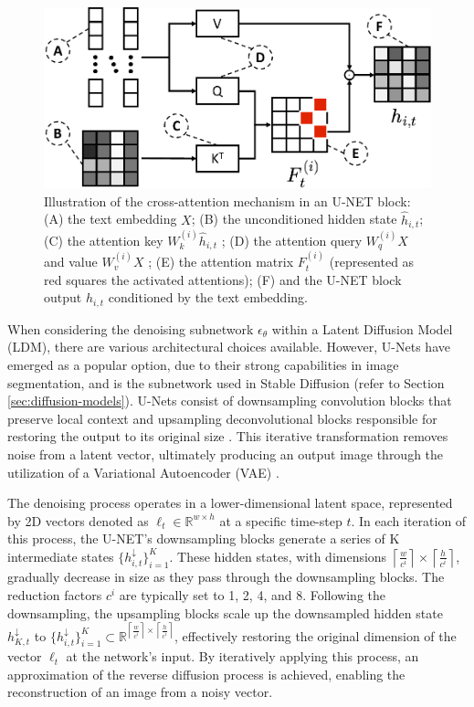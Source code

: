 \begin{figure}
    \centering
    \includegraphics[width=0.75\columnwidth]{img/3-methodology/attention-diagram.pdf}
    \caption[Illustration of cross-attention mechanism]{Illustration of the cross-attention mechanism in an U-NET block: (A) the text embedding $X$; (B) the unconditioned hidden state $\hat{h}_{i,t}$;(C) the attention key $W_{k}^{(i)}\hat{h}_{i,t}$ ; (D) the attention query $W_{q}^{(i)}X$ and value $W_{v}^{(i)}X$ ; (E) the attention matrix $F_{t}^{(i)}$ (represented as red squares the activated attentions); (F) and the U-NET block output $h_{i,t}$ conditioned by the text embedding.}
    \label{fig:attention-diagram}
\end{figure}


When considering the denoising subnetwork $\epsilon_\theta$ within a Latent Diffusion Model (LDM), there are various architectural choices available. However, U-Nets \cite{UNET} have emerged as a popular option, due to their strong capabilities in image segmentation, and is the subnetwork used in Stable Diffusion (refer to Section \ref{sec:diffusion-models}). U-Nets consist of downsampling convolution blocks that preserve local context and upsampling deconvolutional blocks responsible for restoring the output to its original size \cite{DAAM}. This iterative transformation removes noise from a latent vector, ultimately producing an output image through the utilization of a Variational Autoencoder (VAE) \cite{rombach2022high}.


The denoising process operates in a lower-dimensional latent space, represented by 2D vectors denoted as $\ell_t\in \mathbb{R}^{w \times h}$ at a specific time-step $t$. In each iteration of this process, the U-NET's downsampling blocks generate a series of K intermediate states $\{ h_{i,t}^{\downarrow}\}_{i=1}^{K}$. These hidden states, with dimensions $\left \lceil \frac{w}{c^i} \right \rceil \times \left \lceil \frac{h}{c^i} \right \rceil$, gradually decrease in size as they pass through the downsampling blocks. The reduction factors $c^i$ are typically set to 1, 2, 4, and 8. Following the downsampling, the upsampling blocks scale up the downsampled hidden state $h_{K,t}^\downarrow$ to $\{ h_{i,t}^{\downarrow}\}_{i=1}^{K} \subset \mathbb{R}^{\left \lceil \frac{w}{c^i} \right \rceil \times \left \lceil \frac{h}{c^i} \right \rceil}$, effectively restoring the original dimension of the vector $\ell_t$ at the network's input. By iteratively applying this process, an approximation of the reverse diffusion process is achieved, enabling the reconstruction of an image from a noisy vector.

